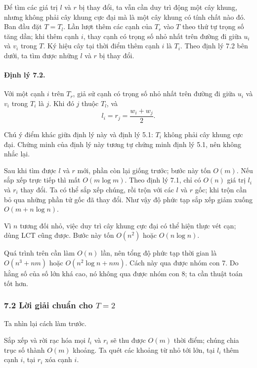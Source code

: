 \documentclass[11pt]{article}
\begin{document}
Để tìm các giá trị \(l\) và \(r\) bị thay đổi, ta vẫn cần duy trì động một cây
khung, nhưng không phải cây khung cực đại mà là một cây khung có tính chất nào
đó. Ban đầu đặt \(T=T_l\). Lần lượt thêm các cạnh của \(T_r\) vào \(T\) theo
thứ tự trọng số tăng dần; khi thêm cạnh \(i\), thay cạnh có trọng số nhỏ nhất
trên đường đi giữa \(u_i\) và \(v_i\) trong \(T\). Ký hiệu cây tại thời điểm
thêm cạnh \(i\) là \(T_i\). Theo định lý 7.2 bên dưới, ta tìm được những \(l\)
và \(r\) bị thay đổi.

\paragraph{Định lý 7.2.}
Với một cạnh \(i\) trên \(T_r\), giả sử cạnh có trọng số nhỏ nhất trên đường đi
giữa \(u_i\) và \(v_i\) trong \(T_i\) là \(j\). Khi đó \(j\) thuộc \(T_l\), và
\[
  l_i=r_j=\frac{w_i+w_j}{2}.
\]

Chú ý điểm khác giữa định lý này và định lý 5.1: \(T_i\) không phải cây khung
cực đại. Chứng minh của định lý này tương tự chứng minh định lý 5.1, nên không
nhắc lại.

Sau khi tìm được \(l\) và \(r\) mới, phần còn lại giống trước; bước này tốn
\(O(m)\). Nếu sắp xếp trực tiếp thì mất \(O(m\log m)\). Theo định lý 7.1, chỉ
có \(O(n)\) giá trị \(l_i\) và \(r_i\) thay đổi. Ta có thể sắp xếp chúng, rồi
trộn với các \(l\) và \(r\) gốc; khi trộn cần bỏ qua những phần tử gốc đã thay
đổi. Như vậy độ phức tạp sắp xếp giảm xuống \(O(m+n\log n)\).

Vì \(n\) tương đối nhỏ, việc duy trì cây khung cực đại có thể hiện thực vét
cạn; dùng LCT cũng được. Bước này tốn \(O(n^2)\) hoặc \(O(n\log n)\).

Quá trình trên cần làm \(O(n)\) lần, nên tổng độ phức tạp thời gian là
\(O(n^3+nm)\) hoặc \(O(n^2\log n+nm)\). Cách này qua được nhóm con 7. Do hằng số
của số lớn khá cao, nó không qua được nhóm con 8; ta cần thuật toán tốt hơn.

\subsubsection*{\texorpdfstring{7.2 Lời giải chuẩn cho \(T=2\)}{7.2 Lời giải chuẩn cho T=2}}

Ta nhìn lại cách làm trước.

Sắp xếp và rời rạc hóa mọi \(l_i\) và \(r_i\) sẽ thu được \(O(m)\) thời điểm;
chúng chia trục số thành \(O(m)\) khoảng. Ta quét các khoảng từ nhỏ tới lớn,
tại \(l_i\) thêm cạnh \(i\), tại \(r_i\) xóa cạnh \(i\).
\end{document}
